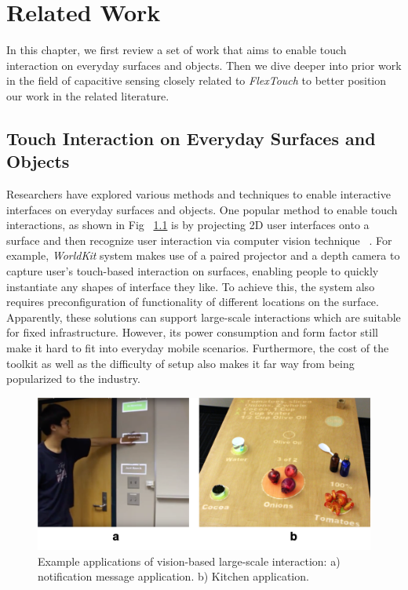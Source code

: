 \chapter{Related Work}
In this chapter, we first review a set of work that aims to enable touch interaction on everyday surfaces and objects. Then we dive deeper into prior work in the field of capacitive sensing closely related to \textit{FlexTouch} to better position our work in the related literature.

\section{Touch Interaction on Everyday Surfaces and Objects}
Researchers have explored various methods and techniques to enable interactive interfaces on everyday surfaces and objects. One popular method to enable touch interactions, as shown in Fig ~\ref{fig:cv-large-scale-interaction} is by projecting 2D user interfaces onto a surface and then recognize user interaction via computer vision technique ~\cite{pinhanez2001everywhere, Fails-2002-Light-Widgets, Wilson-2010-Light-Space, Xiao-WorldKit}. For example, \textit{WorldKit} system makes use of a paired projector and a depth camera to capture user's touch-based interaction on surfaces, enabling people to quickly instantiate any shapes of interface they like. To achieve this, the system also requires preconfiguration of functionality of different locations on the surface. Apparently, these solutions can support large-scale interactions which are suitable for fixed infrastructure. However, its power consumption and form factor still make it hard to fit into everyday mobile scenarios. Furthermore, the cost of the toolkit as well as the difficulty of setup also makes it far way from being popularized to the industry.

\begin{figure}[ht]
    \centering
	\includegraphics[width=0.95\columnwidth]{figures/cv-large-scale-sensing.png}
	\setlength{\belowcaptionskip}{-6pt}
    \caption{Example applications of vision-based large-scale interaction: a) notification message application. b) Kitchen application.}
    \label{fig:cv-large-scale-interaction}
\end{figure}

